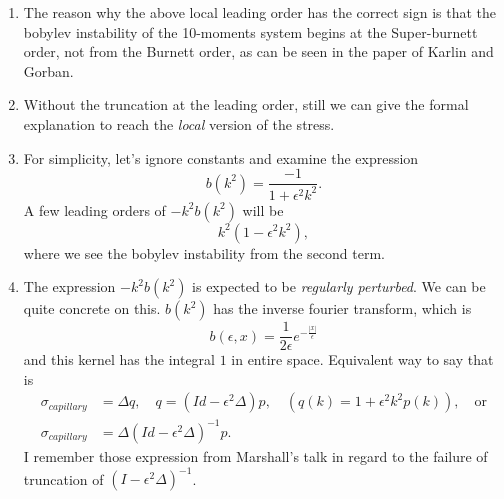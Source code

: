 \documentclass[a4paper,12pt]{article}
\begin{document}
\begin{enumerate}
\begin{enumerate}
 \item The reason why the above local leading order has the correct sign is that the bobylev instability of the 10-moments system begins at the Super-burnett order, not from the Burnett order, as can be seen in the paper of Karlin and Gorban. 
 
 \item Without the truncation at the leading order, still we can give the formal explanation to reach the {\it local} version of the stress.
 
 \item For simplicity, let's ignore constants and examine the expression 
 $$b(k^2) = \frac{-1}{1+\epsilon^2 k^2}.$$ A few leading orders of $-k^2b(k^2)$ will be
 $$ k^2(1 - \epsilon^2k^2),$$
 where we see the bobylev instability from the second term.
 \item The expression $-k^2b(k^2)$ is expected to be {\it regularly perturbed}. We can be quite concrete on this. $b(k^2)$ has the inverse fourier transform, which is 
$$ b(\epsilon,x) = \frac{1}{2\epsilon} e^{-\frac{|x|}{\epsilon}} $$
and this kernel has the integral $1$ in entire space. Equivalent way to say that is 
\begin{align*}
 \sigma_{capillary} &= \Delta q, \quad q = (Id - \epsilon^2 \Delta) p, \quad (q(k) = 1+\epsilon^2k^2 p(k)), \quad \text{or}\\
 \sigma_{capillary} &= \Delta(Id - \epsilon^2 \Delta)^{-1} p.
\end{align*}
I remember those expression from Marshall's talk in regard to the failure of truncation of $(I-\epsilon^2 \Delta)^{-1}$. 


\end{enumerate}
\end{enumerate}
\end{document}
